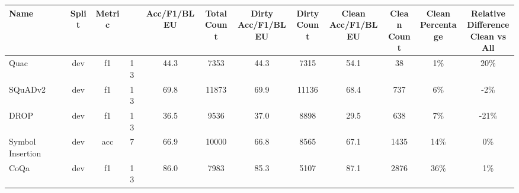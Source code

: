 \documentclass{article}
\begin{document}
    \begin{table}
        {
        \footnotesize
        \begin{adjustwidth}{-1.4in}{-1.4in}
    \begin{center}
    \begin{tabular}{lccccccccccc}
\toprule
                Name &  Split & Metric &    & Acc/F1/BLEU & \shortstack{Total\\Count} & \shortstack{Dirty\\Acc/F1/BLEU} & \shortstack{Dirty\\Count} & \shortstack{Clean\\Acc/F1/BLEU} & \shortstack{Clean\\Count} & \shortstack{Clean\\Percentage} & \shortstack{Relative\\Difference\\Clean vs All} \\
\midrule
                Quac &   dev &       f1 &  13 &        44.3 &                      7353 &                            44.3 &                      7315 &                            54.1 &                        38 &                             1\% &                                                20\% \\
             SQuADv2 &   dev &       f1 &  13 &        69.8 &                     11873 &                            69.9 &                     11136 &                            68.4 &                       737 &                             6\% &                                                -2\% \\
                DROP &   dev &       f1 &  13 &        36.5 &                      9536 &                            37.0 &                      8898 &                            29.5 &                       638 &                             7\% &                                               -21\% \\
    Symbol Insertion &   dev &      acc &   7 &        66.9 &                     10000 &                            66.8 &                      8565 &                            67.1 &                      1435 &                            14\% &                                                 0\% \\
                CoQa &   dev &       f1 &  13 &        86.0 &                      7983 &                            85.3 &                      5107 &                            87.1 &                      2876 &                            36\% &                                                 1\% \\

\end{tabular}
\end{center}
\end{adjustwidth}}
\end{table}
\end{document}

